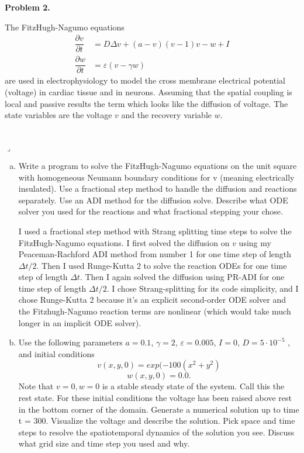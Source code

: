 \documentclass[12pt]{article}
\newenvironment{myprob}[1]
    {%
    \noindent{\Huge$\ulcorner$}\textbf{#1.}\begin{em}
    }
    { 
    \end{em} \\ \hphantom{l} \hfill {\Huge$\lrcorner$} }
\begin{document}
\begin{myprob}{Problem 2}
The FitzHugh-Nagumo equations
\begin{align*}
\dfrac{\partial v}{\partial t} &= D \Delta v + (a-v)(v-1)v -w + I \\
\dfrac{\partial w}{\partial t} &= \varepsilon(v-\gamma w)
\end{align*}
are used in electrophysiology to model the cross membrane electrical potential (voltage) in cardiac tissue and in neurons. Assuming that the spatial coupling is local and passive results the term which looks like the diffusion of voltage. The state variables are the voltage $v$ and the recovery variable $w$.
\end{myprob}
\begin{enumerate}[(a)]
\item Write a program to solve the FitzHugh-Nagumo equations on the unit square with homogeneous Neumann boundary conditions for v (meaning electrically insulated). Use a fractional step method to handle the diffusion and reactions separately. Use an ADI method for the diffusion solve. Describe what ODE solver you used for the reactions and what fractional stepping your chose.

I used a fractional step method with Strang splitting time steps to solve the FitzHugh-Nagumo equations.  I first solved the diffusion on $v$ using my Peaceman-Rachford ADI method from number 1 for one time step of length $\Delta t/2$.  Then I used Runge-Kutta 2 to solve the reaction ODEs for one time step of length $\Delta t$.  Then I again solved the diffusion using PR-ADI for one time step of length $\Delta t/2$.  I chose Strang-splitting for its code simplicity, and I chose Runge-Kutta 2 because it's an explicit second-order ODE solver and the Fitzhugh-Nagumo reaction terms are nonlinear (which would take much longer in an implicit ODE solver).

\item Use the following parameters $a = 0.1$, $\gamma = 2$, $\varepsilon = 0.005$, $I = 0$, $D = 5 \cdot 10^{-5}$ , and initial conditions 
$$v(x, y, 0) = exp(-100(x^2 + y^2)$$
$$w(x, y, 0) = 0.0.$$
Note that $v = 0, w = 0$ is a stable steady state of the system. Call this the rest state. For these initial conditions the voltage has been raised above rest in the bottom corner of the domain. Generate a numerical solution up to time t = 300. Visualize the voltage and describe the solution. Pick space and time steps to resolve the spatiotemporal dynamics of the solution you see. Discuss what grid size and time step you used and why.


\end{enumerate}
\end{document}
